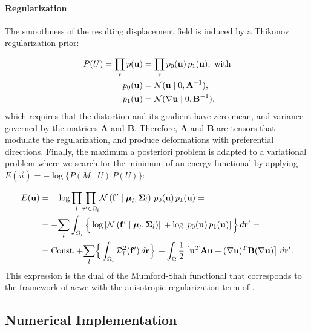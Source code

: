 \paragraph*{Regularization}
The smoothness of the resulting displacement field is induced
  by a Thikonov regularization prior:

  \begin{align}
  P(U) = \underset{\vec{r}}{\prod}\, p(\vec{u}) &=
  \underset{\vec{r}}{\prod}\, p_0(\vec{u}) \, p_1(\vec{u}), \text{ with} \\
  p_0(\vec{u}) &= \mathcal{N}( \vec{u} \mid 0, \mathbf{A}^{-1}), \notag\\
  p_1(\vec{u}) &= \mathcal{N}(  \nabla \vec{u} \mid 0, \mathbf{B}^{-1}),
  \label{eq:regseg-thikonov}
  \end{align}
 which requires that the distortion and its gradient have zero mean,
   and variance governed by the matrices $\mathbf{A}$ and $\mathbf{B}$.
Therefore, $\mathbf{A}$ and $\mathbf{B}$ are tensors that modulate the regularization, and
  produce deformations with preferential directions.
Finally, the maximum a posteriori problem is adapted to a variational problem where we search for
  the minimum of an energy functional by applying $E(\vec{u}) = -\log \{P( M \mid U) \, P(U)\}$:

  \begin{align}
  E(\vec{u}) &= -\log \underset{l}{\prod}
  \underset{\vec{r}' \in \Omega_l}{\prod}
  \mathcal{N} \left( \vec{f}' \mid \boldsymbol{\mu}_l, \boldsymbol{\Sigma}_l \right)\,p_0( \vec{u})\,p_1( \vec{u}) =
\notag\\ &= - \underset{l}{\sum} \int_{\Omega_l} \Big\{ \log \left[ \mathcal{N} \left( \vec{f}' \mid \boldsymbol{\mu}_l, \boldsymbol{\Sigma}_l \right) \right] \, + \log \left[ p_0( \vec{u})\,p_1( \vec{u}) \right] \Big\} \, d\vec{r}'
   = \notag\\ &=
  \const + \underset{l}{\sum} \Big\{ \int_{\Omega_l} \mdist{f'}{l} \,d\vec{r} \Big\} \,
  + \int_{\Omega} \frac12 \left[ \vec{u}^T \mathbf{A} \vec{u} + (\nabla \vec{u})^T \mathbf{B} (\nabla \vec{u}) \right] \,d\vec{r}'.
  \label{eq:regseg-energy}
  \end{align}%
This expression is the dual of the Mumford-Shah functional that corresponds
  to the framework of \acrlong*{acwe} \citep{chan_active_2001}
  with the anisotropic regularization term of \cite{nagel_investigation_1986}.


\subsection{Numerical Implementation}
\label{sec:regseg-numerical_implementation}

